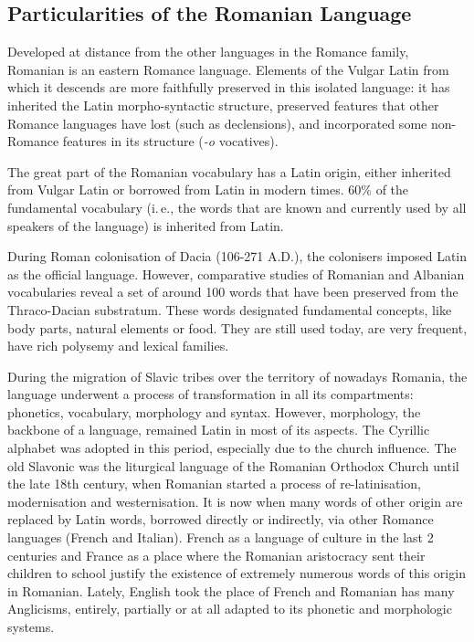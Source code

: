 \begin{multicols}{2}
\subsection{Particularities of the Romanian Language}

Developed at distance from the other languages in the Romance family, Romanian is an eastern Romance language. Elements of the Vulgar Latin from which it descends are more faithfully preserved in this isolated language: it has inherited the Latin morpho-syntactic structure, preserved features that other Romance languages have lost (such as declensions), and incorporated some non-Romance features in its structure (\textit{-o} vocatives). 

The great part of the Romanian vocabulary has a Latin origin, either inherited from Vulgar Latin or borrowed from Latin in modern times. 60\% of the fundamental vocabulary (i.\,e., the words that are known and currently used by all speakers of the language) is inherited from Latin. 

During Roman colonisation of Dacia (106-271 A.D.), the colonisers imposed Latin as the official language. However, comparative studies of Romanian and Albanian vocabularies reveal a set of around 100 words that have been preserved from the Thraco-Dacian substratum. These words designated fundamental concepts, like body parts, natural elements or food. They are still used today, are very frequent, have rich polysemy and lexical families.

During the migration of Slavic tribes over the territory of nowadays Romania, the language underwent a process of transformation in all its compartments: phonetics, vocabulary, morphology and syntax. However, morphology, the backbone of a language, remained Latin in most of its aspects. The Cyrillic alphabet was adopted in this period, especially due to the church influence. The old Slavonic was the liturgical language of the Romanian Orthodox Church until the late 18th century, when Romanian started a process of re-latinisation, modernisation and westernisation. It is now when many words of other origin are replaced by Latin words, borrowed directly or indirectly, via other Romance languages (French and Italian). French as a language of culture in the last 2 centuries and France as a place where the Romanian aristocracy sent their children to school justify the existence of extremely numerous words of this origin in Romanian. Lately, English took the place of French and Romanian has many Anglicisms, entirely, partially or at all adapted to its phonetic and morphologic systems. 


\end{multicols}
